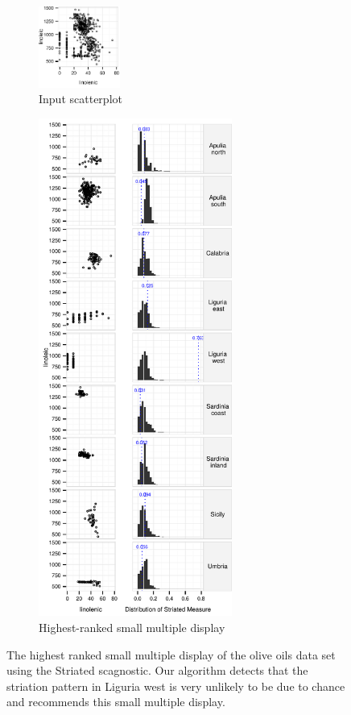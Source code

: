 \begin{figure}[t]
 \centering
    \begin{subfigure}{1.05in}
	\includegraphics[width=1.05in]{images/linolenic-linoleic.pdf}
	  \caption{Input scatterplot}
	 \label{fig:vrich_all}
    \end{subfigure}
    \begin{subfigure}{2.5in}
	\includegraphics[width=2.5in]{images/15_729035813077-region.pdf}
	  \caption{Highest-ranked small multiple display}
	 \label{fig:vrich_sm}
    \end{subfigure}
	\caption{The highest ranked small multiple display of the olive oils data set using the Striated scagnostic. Our algorithm detects that the striation pattern in Liguria west is very unlikely to be due to chance and recommends this small multiple display. }
\end{figure}

